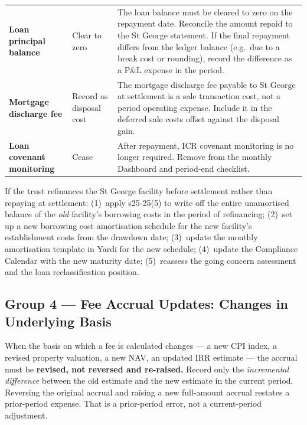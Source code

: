 \documentclass[10pt,a4paper]{article}
\begin{document}
{\begin{longtable}{@{} L{3.2cm} L{1.8cm} L{7.7cm} @{}}
\textbf{Loan principal balance} & Clear to zero & The loan balance must be cleared to zero on the repayment date. Reconcile the amount repaid to the St George statement. If the final repayment differs from the ledger balance (e.g.\ due to a break cost or rounding), record the difference as a P\&L expense in the period. \\
\textbf{Mortgage discharge fee} & Record as disposal cost & The mortgage discharge fee payable to St George at settlement is a sale transaction cost, not a period operating expense. Include it in the deferred sale costs offset against the disposal gain. \\
\textbf{Loan covenant monitoring} & Cease & After repayment, ICR covenant monitoring is no longer required. Remove from the monthly Dashboard and period-end checklist. \\
\bottomrule
\end{longtable}}

\begin{note}
If the trust refinances the St George facility before settlement rather than repaying at settlement: (1)~apply s25-25(5) to write off the entire unamortised balance of the \emph{old} facility's borrowing costs in the period of refinancing; (2)~set up a new borrowing cost amortisation schedule for the new facility's establishment costs from the drawdown date; (3)~update the monthly amortisation template in Yardi for the new schedule; (4)~update the Compliance Calendar with the new maturity date; (5)~reassess the going concern assessment and the loan reclassification position.
\end{note}


\subsection{Group 4 --- Fee Accrual Updates: Changes in Underlying Basis}
\label{sec:grp4}

\begin{critical}
When the basis on which a fee is calculated changes --- a new CPI index, a revised property valuation, a new NAV, an updated IRR estimate --- the accrual must be \textbf{revised, not reversed and re-raised.} Record only the \emph{incremental difference} between the old estimate and the new estimate in the current period. Reversing the original accrual and raising a new full-amount accrual restates a prior-period expense. That is a prior-period error, not a current-period adjustment.
\end{critical}
\end{document}
